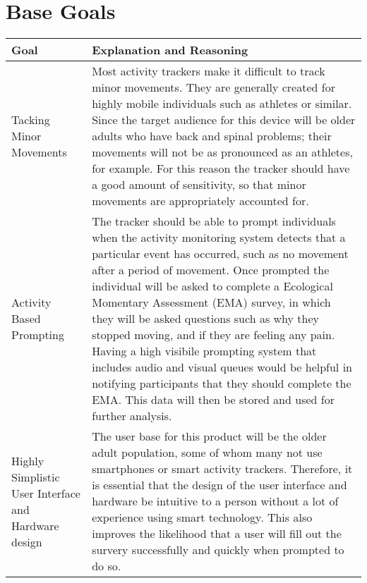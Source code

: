 \documentclass[12pt]{article}
\begin{document}
\section{Base Goals}
\begin{center}
    \begin{tabular}{ | m{7em} | m{32em}| }
        \hline
        \textbf{Goal}                                    & \textbf{Explanation and Reasoning}                                                                                                                                                                                                                                                                                                                                                                                                                                                                                                                                                               \\
        \hline
        Tacking Minor Movements                          & Most activity trackers make it difficult to track minor movements.
        They are generally created for highly mobile individuals such as athletes or similar. Since the target audience for this device will be older adults who have back and spinal problems; their movements will not be as pronounced as an athletes, for example. For this reason the tracker should have a good amount of sensitivity, so that minor movements are appropriately accounted for.                                                                                                                                                                                                                                                       \\
        \hline
        Activity Based Prompting                            & The tracker should be able to prompt individuals when the activity monitoring system detects that a particular event has occurred, such as no movement after a period of movement.  Once prompted the individual will be asked to complete a Ecological Momentary Assessment (EMA) survey, in which they will be asked questions such as why they stopped moving, and if they are feeling any pain. Having a high visibile prompting system that includes audio and visual queues would be helpful in notifying participants that they should complete the EMA. This data will then be stored and used for further analysis. \\
        \hline
        Highly \linebreak Simplistic User Interface and Hardware design & The user base for this product will be the older adult population, some of whom many not use smartphones or smart activity trackers. Therefore, it is essential that the design of the user interface and hardware be intuitive to a person without a lot of experience using smart technology. This also improves the likelihood that a user will fill out the survery successfully and quickly when prompted to do so.                                                                                                                                                                         \\

\end{tabular}
\end{center}
\end{document}
